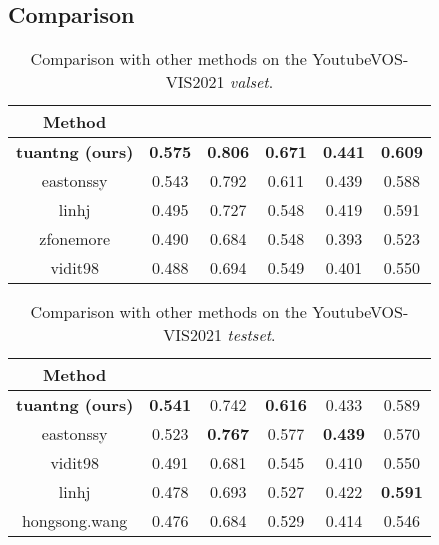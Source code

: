 \documentclass[10pt,twocolumn,letterpaper]{article}
\begin{document}
\subsection{Comparison}
\label{sec:comparison}
\begin{table}[!th]
	\begin{center}
		\small
		\begin{tabular}{c|ccccc}
			\hline
			Method &    &   &   &    &   \\
			\hline
			\textbf{tuantng (ours)} & \textbf{0.575} & \textbf{0.806} & \textbf{0.671} & \textbf{0.441} & \textbf{0.609} \\
			eastonssy \cite{yang2021tracking} & 0.543 & 0.792 & 0.611 & 0.439 & 0.588 \\
			linhj     & 0.495 & 0.727 & 0.548 & 0.419 & 0.591 \\
			zfonemore & 0.490 & 0.684 & 0.548 & 0.393 & 0.523 \\
			vidit98 \cite{goel2021msn}   & 0.488 & 0.694 & 0.549 & 0.401 & 0.550 \\
			\hline
		\end{tabular}
	\end{center}
	\caption{Comparison with other methods on the YoutubeVOS-VIS2021 \textit{valset}.}
	\label{tab:comparison-vis2021-valset}
\end{table}

\begin{table}[!th]
	\begin{center}
		\small{
		\begin{tabular}{c|ccccc}
			\hline
			Method &    &   &   &    &   \\
			\hline
			\textbf{tuantng (ours)}  & \textbf{0.541} & 0.742          & \textbf{0.616} & 0.433          & 0.589          \\
			eastonssy \cite{yang2021tracking}      & 0.523          & \textbf{0.767} & 0.577          & \textbf{0.439} & 0.570          \\
			vidit98 \cite{goel2021msn}         & 0.491          & 0.681          & 0.545          & 0.410          & 0.550          \\
			linhj           & 0.478          & 0.693          & 0.527          & 0.422          & \textbf{0.591} \\
			hongsong.wang   & 0.476          & 0.684          & 0.529          & 0.414          & 0.546 \\
			\hline     
		\end{tabular}}
	\end{center}
	\caption{Comparison with other methods on the YoutubeVOS-VIS2021 \textit{testset}.}
	\label{tab:comparison-vis2021-testset}
\end{table}
\end{document}

